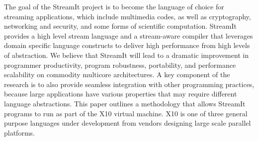 The goal of the StreamIt project is to become the language of choice
for streaming applications, which include multimedia codes, as well as
cryptography, networking and security, and some forms of scientific
computation. StreamIt provides a high level stream language and a
stream-aware compiler that leverages domain specific language
constructs to deliver high performance from high levels of
abstraction. We believe that StreamIt will lead to a dramatic
improvement in programmer productivity, program robustness,
portability, and performance scalability on commodity multicore
architectures. A key component of the research is to also provide
seamless integration with other programming practices,  because large
applications have various properties that may require different
language abstractions. This paper outlines a methodology that allows
StreamIt programs to run as part of the X10 virtual machine. X10 is
one of three general purpose languages under development from vendors
designing large scale parallel platforms.
